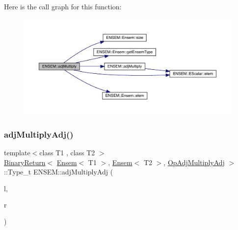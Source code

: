 Here is the call graph for this function\+:\nopagebreak
\begin{figure}[H]
\begin{center}
\leavevmode
\includegraphics[width=350pt]{d1/d9e/group__eensem_ga6ec27b863a98d9cf552c2a0194dc53f5_cgraph}
\end{center}
\end{figure}
\mbox{\label{group__eensem_gaf92e62b8e69b299d4f4193702fb8dab3}} 
\subsubsection{\texorpdfstring{adjMultiplyAdj()}{adjMultiplyAdj()}\hspace{0.1cm}{\footnotesize\ttfamily [1/3]}}
{\footnotesize\ttfamily template$<$class T1 , class T2 $>$ \\
\mbox{\hyperlink{structENSEM_1_1BinaryReturn}{Binary\+Return}}$<$ \mbox{\hyperlink{classENSEM_1_1Ensem}{Ensem}}$<$ T1 $>$, \mbox{\hyperlink{classENSEM_1_1Ensem}{Ensem}}$<$ T2 $>$, \mbox{\hyperlink{structENSEM_1_1OpAdjMultiplyAdj}{Op\+Adj\+Multiply\+Adj}} $>$\+::Type\+\_\+t E\+N\+S\+E\+M\+::adj\+Multiply\+Adj (\begin{DoxyParamCaption}\item[{const \mbox{\hyperlink{classENSEM_1_1Ensem}{Ensem}}$<$ T1 $>$ \&}]{l,  }\item[{const \mbox{\hyperlink{classENSEM_1_1Ensem}{Ensem}}$<$ T2 $>$ \&}]{r }\end{DoxyParamCaption})\hspace{0.3cm}{\ttfamily [inline]}}

